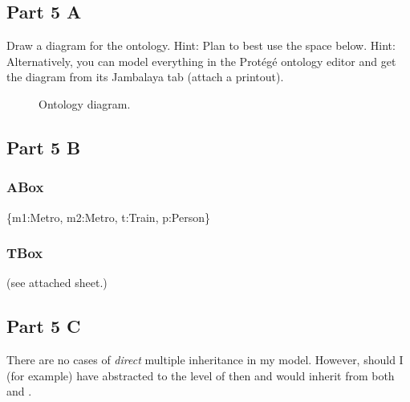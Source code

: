 \documentclass[letterpaper,10pt,english]{sphinxmanual}
\begin{document}
\subsection{Part 5 A}
\label{assign3:part-5-a}
Draw a diagram for the ontology.
Hint: Plan to best use the space below.
Hint: Alternatively, you can model everything in the Protégé ontology editor and
get the diagram from its Jambalaya tab (attach a printout).
\begin{figure}[htbp]
\centering
\capstart

\caption{Ontology diagram.}\end{figure}


\subsection{Part 5 B}
\label{assign3:part-5-b}

\subsubsection{ABox}
\label{assign3:abox}
\{m1:Metro, m2:Metro, t:Train, p:Person\}


\subsubsection{TBox}
\label{assign3:tbox}
(see attached sheet.)


\subsection{Part 5 C}
\label{assign3:part-5-c}
There are no cases of \emph{direct} multiple inheritance in my model.  However, should I (for
example) have abstracted  to the level of
 then  and  would inherit from both
 and .
\end{document}
